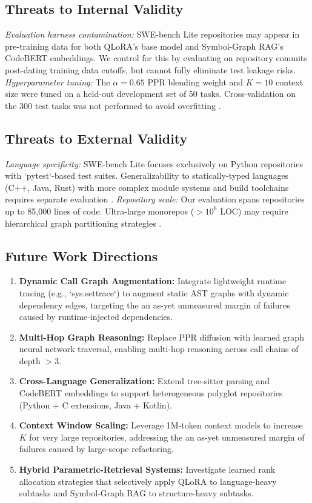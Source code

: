 \documentclass[10pt,twocolumn,letterpaper]{article}
\begin{document}
\subsection{Threats to Internal Validity}


\textit{Evaluation harness contamination:} SWE-bench Lite repositories may appear in pre-training data for both QLoRA's base model and Symbol-Graph RAG's CodeBERT embeddings. We control for this by evaluating on repository commits post-dating training data cutoffs, but cannot fully eliminate test leakage risks. \textit{Hyperparameter tuning:} The $\alpha = 0.65$ PPR blending weight and $K = 10$ context size were tuned on a held-out development set of 50 tasks. Cross-validation on the 300 test tasks was not performed to avoid overfitting \cite{arxiv_2203_02155}.


\subsection{Threats to External Validity}


\textit{Language specificity:} SWE-bench Lite focuses exclusively on Python repositories with `pytest`-based test suites. Generalizability to statically-typed languages (C++, Java, Rust) with more complex module systems and build toolchains requires separate evaluation \cite{doaj_001772c2113c476d9d5d40452c8e10e1}. \textit{Repository scale:} Our evaluation spans repositories up to 85,000 lines of code. Ultra-large monorepos ($>10^6$ LOC) may require hierarchical graph partitioning strategies \cite{arxiv_2411_15594}.


\subsection{Future Work Directions}


\begin{enumerate}
  \item \textbf{Dynamic Call Graph Augmentation:} Integrate lightweight runtime tracing (e.g., `sys.settrace`) to augment static AST graphs with dynamic dependency edges, targeting the an as-yet unmeasured margin of failures caused by runtime-injected dependencies.
  \item \textbf{Multi-Hop Graph Reasoning:} Replace PPR diffusion with learned graph neural network traversal, enabling multi-hop reasoning across call chains of depth $> 3$.
  \item \textbf{Cross-Language Generalization:} Extend tree-sitter parsing and CodeBERT embeddings to support heterogeneous polyglot repositories (Python + C extensions, Java + Kotlin).
  \item \textbf{Context Window Scaling:} Leverage 1M-token context models to increase $K$ for very large repositories, addressing the an as-yet unmeasured margin of failures caused by large-scope refactoring.
  \item \textbf{Hybrid Parametric-Retrieval Systems:} Investigate learned rank allocation strategies that selectively apply QLoRA to language-heavy subtasks and Symbol-Graph RAG to structure-heavy subtasks.
\end{enumerate}
\end{document}
